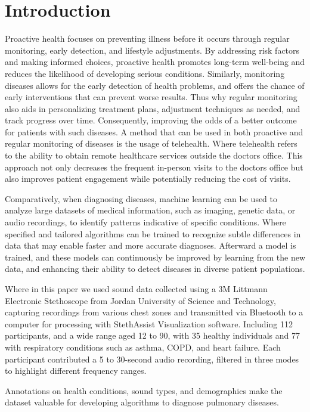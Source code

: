 \documentclass[twocolumn]{article}
\begin{document}
\section{Introduction}
Proactive health focuses on preventing illness before it occurs through regular monitoring, early detection, and lifestyle adjustments. By addressing risk factors and making informed choices, proactive health promotes long-term well-being and reduces the likelihood of developing serious conditions. Similarly, monitoring diseases allows for the early detection of health problems, and offers the chance of early interventions that can prevent worse results. Thus why regular monitoring also aids in personalizing treatment plans, adjustment techniques as needed, and track progress over time. Consequently, improving the odds of a better outcome for patients with such diseases. A method that can be used in both proactive and regular monitoring of diseases is the usage of telehealth. Where telehealth refers to the ability to obtain remote healthcare services outside the doctors office. This approach not only decreases the frequent in-person visits to the doctors office but also improves patient engagement while potentially reducing the cost of visits. 

Comparatively, when diagnosing diseases, machine learning can be used to analyze large datasets of medical information, such as imaging, genetic data, or audio recordings, to identify patterns indicative of specific conditions. Where specified and tailored algorithms can be trained to recognize subtle differences in data that may enable faster and more accurate diagnoses. Afterward a model is trained, and these models can continuously be improved by learning from the new data, and enhancing their ability to detect diseases in diverse patient populations.

Where in this paper we used sound data collected using a 3M Littmann Electronic Stethoscope from Jordan University of Science and Technology, capturing recordings from various chest zones and transmitted via Bluetooth to a computer for processing with StethAssist Visualization software. Including 112 participants, and a wide range aged 12 to 90, with 35 healthy individuals and 77 with respiratory conditions such as asthma, COPD, and heart failure. Each participant contributed a 5 to 30-second audio recording, filtered in three modes to highlight different frequency ranges. 

Annotations on health conditions, sound types, and demographics make the dataset valuable for developing algorithms to diagnose pulmonary diseases.
\end{document}
